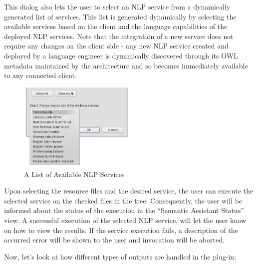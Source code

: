 This dialog also lets the user to select an NLP service from a dynamically
generated list of services. This list is generated dynamically by selecting the
available services based on the client and the language capabilities of the
deployed NLP services. Note that the integration of a new service does not
require any changes on the client side - any new NLP service created and
deployed by a language engineer is dynamically discovered through its OWL
metadata maintained by the architecture and so becomes immediately available to
any connected client.

\begin{figure}[htb]
\begin{center}
  \includegraphics[width=0.5\textwidth]{pictures/eclipse_services.jpg}
  \caption{A List of Available NLP Services}
  \label{fig:eclipse_services}
\end{center}
\end{figure}

Upon selecting the resource files and the desired service, the user can execute
the selected service on the checked files in the tree. Consequently, the user will be informed about the status of the execution in the ``Semantic Assistant Status'' view. A successful execution of the selected NLP service, will let the user know on how to view the results. If the service execution fails, a description of the occurred error will be shown to the user and invocation will be aborted.

Now, let's look at how different types of outputs are handled in the plug-in:


